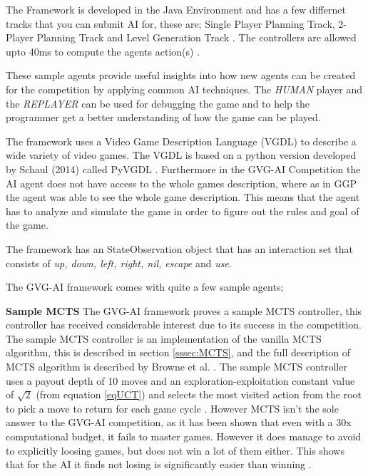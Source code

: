 \documentclass[journal]{IEEEtran}
\begin{document}
		The Framework is developed in the Java Environment and has a few differnet tracks that you can submit AI for, these are; Single Player Planning Track, 2-Player Planning Track and Level Generation Track \cite{gaina2016general}.
		The controllers are allowed upto 40ms to compute the agents action(s) \cite{perez2016GVGAICompetition, GVGAI}.
		
		
		These sample agents provide useful insights into how new agents can be created for the competition by applying common AI techniques.
		The \textit{HUMAN} player and the \textit{REPLAYER} can be used for debugging the game and to help the programmer get a better understanding of how the game can be played.
		
		
		The framework uses a Video Game Description Language (VGDL) to describe a wide variety of video games. The VGDL is based on a python version developed by Schaul (2014) called PyVGDL \cite{schuster2015mcts}. Furthermore in the GVG-AI Competition the AI agent does not have access to the whole games description, where as in GGP the agent was able to see the whole game description. This means that the agent has to analyze and simulate the game in order to figure out the rules and goal of the game.
		
		
		The framework has an StateObservation object that has an interaction set that consists of \textit{up, down, left, right, nil, escape} and \textit{use}.

		The GVG-AI framework comes with quite a few sample agents;
		
		\textbf{Sample MCTS} \label{sssec:sampleMCTS}
			The GVG-AI framework proves a sample MCTS controller, this controller has received considerable interest due to its success in the competition. 
			The sample MCTS controller is an implementation of the vanilla MCTS algorithm, this is described in section \ref{sssec:MCTS}, and the full description of MCTS algorithm is described by Browne et al. \cite{browne2012survey}.
			The sample MCTS controller uses a payout depth of 10 moves and an exploration-exploitation constant value of $\sqrt{2}$ (from equation \ref{eqUCT}) and selects the most visited action from the root to pick a move to return for each game cycle \cite{perez20162014}.
			However MCTS isn't the sole answer to the GVG-AI competition, as it has been shown that even with a 30x computational budget, it fails to master games. However it does manage to avoid to explicitly loosing games, but does not win a lot of them either. This shows that for the AI it finds not losing is significantly easier than winning \cite{nelson2016investigating}.
			
\end{document}
